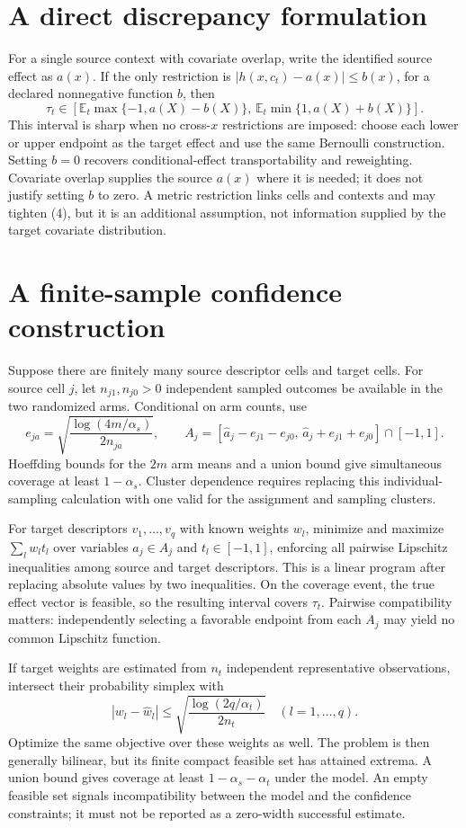 \documentclass[11pt]{article}
\newcommand{\E}{\mathbb{E}}
\begin{document}
\section{A direct discrepancy formulation}
For a single source context with covariate overlap, write the identified
source effect as $a(x)$. If the only restriction is
$|h(x,c_t)-a(x)|\le b(x)$, for a declared nonnegative function $b$, then
\[
 \tau_t\in\left[
 \E_t\max\{-1,a(X)-b(X)\},\,
 \E_t\min\{1,a(X)+b(X)\}\right].                         \tag{4}
\]
This interval is sharp when no cross-$x$ restrictions are imposed:
choose each lower or upper endpoint as the target effect and use the same
Bernoulli construction. Setting $b=0$ recovers conditional-effect
transportability and reweighting. Covariate overlap supplies the source
$a(x)$ where it is needed; it does not justify setting $b$ to zero.
A metric restriction links cells and contexts and may tighten (4), but
it is an additional assumption, not information supplied by the target
covariate distribution.

\section{A finite-sample confidence construction}
Suppose there are finitely many source descriptor cells and target cells.
For source cell $j$, let $n_{j1},n_{j0}>0$ independent sampled outcomes
be available in the two randomized arms. Conditional on arm counts, use
\[
 e_{ja}=\sqrt{\frac{\log(4m/\alpha_s)}{2n_{ja}}},\qquad
 A_j=[\widehat a_j-e_{j1}-e_{j0},\,
      \widehat a_j+e_{j1}+e_{j0}]\cap[-1,1].               \tag{5}
\]
Hoeffding bounds for the $2m$ arm means and a union bound give simultaneous
coverage at least $1-\alpha_s$. Cluster dependence requires replacing
this individual-sampling calculation with one valid for the assignment
and sampling clusters.

For target descriptors $v_1,\ldots,v_q$ with known weights $w_l$, minimize
and maximize $\sum_lw_l t_l$ over variables $a_j\in A_j$ and
$t_l\in[-1,1]$, enforcing all pairwise Lipschitz inequalities among source
and target descriptors. This is a linear program after replacing absolute
values by two inequalities. On the coverage event, the true effect vector
is feasible, so the resulting interval covers $\tau_t$. Pairwise
compatibility matters: independently selecting a favorable endpoint from
each $A_j$ may yield no common Lipschitz function.

If target weights are estimated from $n_t$ independent representative
observations, intersect their probability simplex with
\[
 |w_l-\widehat w_l|\le
 \sqrt{\frac{\log(2q/\alpha_t)}{2n_t}}\quad(l=1,\ldots,q).
\]
Optimize the same objective over these weights as well. The problem is
then generally bilinear, but its finite compact feasible set has attained
extrema. A union bound gives coverage at least $1-\alpha_s-\alpha_t$
under the model. An empty feasible set signals incompatibility between
the model and the confidence constraints; it must not be reported as a
zero-width successful estimate.
\end{document}
